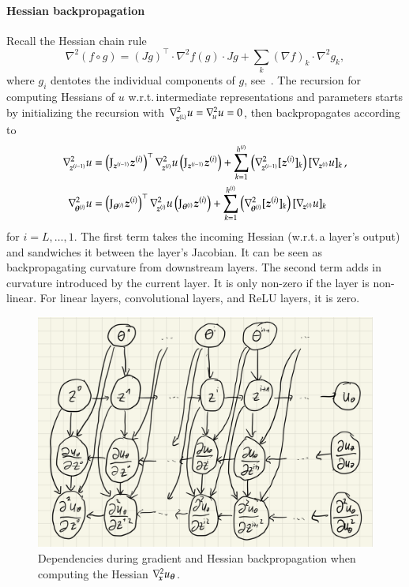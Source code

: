 \paragraph{Hessian backpropagation} 
Recall the Hessian chain rule
\begin{equation*}
    \nabla^2 (f\circ g) = (J g)^\top\cdot \nabla^2 f(g) \cdot Jg + \sum_{k} (\nabla f)_k \cdot \nabla^2 g_k,
\end{equation*}
where $g_i$ dentotes the individual components of $g$, see~\cite{skorski2019chain}. 
The recursion for computing Hessians of $u$
w.r.t.\,intermediate representations and parameters starts by initializing the
recursion with $\nabla_{\!{{\boldsymbol{z}}^{(L)}}}^{2}u = \nabla_{\!{u}}^{2} u = 0$, then
backpropagates according to
\begin{align}\label{eq:hessian-backpropagation}
  \begin{split}
    \gradsquared{\vz^{(i-1)}}u
    &=
      \left( \jac_{\vz^{(i-1)}} \vz^{(i)} \right)^{\top}
      \gradsquared{\vz^{(i)}}u
      \left( \jac_{\vz^{(i-1)}} \vz^{(i)} \right)
      +
      \sum_{k=1}^{h^{(i)}}
      \left(
      \gradsquared{\vz^{(i-1)}} [\vz^{(i)}]_k
      \right)
      [\grad{\vz^{(i)}} u]_k\,,
    \\
    \gradsquared{\vtheta^{(i)}}u
    &=
      \left( \jac_{\vtheta^{(i)}} \vz^{(i)} \right)^{\top}
      \gradsquared{\vz^{(i)}}u
      \left( \jac_{\vtheta^{(i)}} \vz^{(i)} \right)
      +
      \sum_{k=1}^{h^{(i)}}
      \left(
      \gradsquared{\vtheta^{(i)}} [\vz^{(i)}]_k
      \right)
      [\grad{\vz^{(i)}} u]_k
  \end{split}
\end{align}
for $i = L, \dots, 1$.
The first term takes the incoming Hessian (w.r.t.\,a layer's output) and sandwiches it between the layer's Jacobian.
It can be seen as backpropagating curvature from downstream layers.
The second term adds in curvature introduced by the current layer.
It is only non-zero if the layer is non-linear.
For linear layers, convolutional layers, and ReLU layers, it is zero.

\begin{figure}[t]
  \centering
  \includegraphics[width=0.6\linewidth]{figures/HBP_graph.png}
  \caption{Dependencies during gradient and Hessian backpropagation when computing the Hessian $\nabla_{\!{{\boldsymbol{x}}}}^{2}u_{{\boldsymbol{\theta}}}$.}\label{fig:hbp-dependencies}
  \label{fig:hbp-dependencies}
\end{figure}

